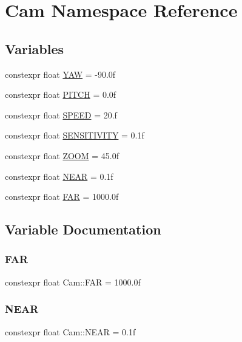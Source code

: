 \hypertarget{namespaceCam}{}\section{Cam Namespace Reference}
\label{namespaceCam}
\subsection*{Variables}
\begin{DoxyCompactItemize}
\item 
constexpr float \hyperlink{namespaceCam_a19ee86132ca8219870515f550db61f93}{Y\+AW} = -\/90.\+0f
\item 
constexpr float \hyperlink{namespaceCam_a5ba61b0ad0aa42c7887436a7f0ac5628}{P\+I\+T\+CH} = 0.\+0f
\item 
constexpr float \hyperlink{namespaceCam_a9827a53b18675bb2e3845aadd51e476e}{S\+P\+E\+ED} = 20.f
\item 
constexpr float \hyperlink{namespaceCam_a3d86110004c8f438362c6a86532efe9c}{S\+E\+N\+S\+I\+T\+I\+V\+I\+TY} = 0.\+1f
\item 
constexpr float \hyperlink{namespaceCam_a44d3e32060d4c50bb27d7110c754cb69}{Z\+O\+OM} = 45.\+0f
\item 
constexpr float \hyperlink{namespaceCam_a73d39e25ed690e5a0ea871fb939d9e4d}{N\+E\+AR} = 0.\+1f
\item 
constexpr float \hyperlink{namespaceCam_a469e970813928ea23b912618d3401368}{F\+AR} = 1000.\+0f
\end{DoxyCompactItemize}


\subsection{Variable Documentation}
\mbox{\label{namespaceCam_a469e970813928ea23b912618d3401368}} 
\subsubsection{\texorpdfstring{F\+AR}{FAR}}
{\footnotesize\ttfamily constexpr float Cam\+::\+F\+AR = 1000.\+0f}

\mbox{\label{namespaceCam_a73d39e25ed690e5a0ea871fb939d9e4d}} 
\subsubsection{\texorpdfstring{N\+E\+AR}{NEAR}}
{\footnotesize\ttfamily constexpr float Cam\+::\+N\+E\+AR = 0.\+1f}

